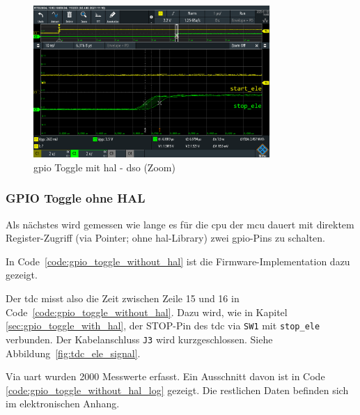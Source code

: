 \begin{figure}[H]
    \centering
    \includegraphics[width=0.8\textwidth]{graphics/gpio_toggle_with_hal_dso_zoom.png}
    \caption{\acrshort{gpio} Toggle mit \acrshort{hal} - \acrshort{dso} (Zoom)}\label{fig:gpio_toggle_with_hal_dso_zoom}
\end{figure}

\subsubsection{GPIO Toggle ohne HAL}\label{sec:gpio_toggle_without_hal}

Als nächstes wird gemessen wie lange es für die \acrshort{cpu} der \acrshort{mcu} dauert mit direktem Register-Zugriff
(via Pointer; ohne \acrshort{hal}-Library) zwei \acrshort{gpio}-Pins zu schalten.

In Code~\ref{code:gpio_toggle_without_hal} ist die Firmware-Implementation dazu gezeigt.



Der \acrshort{tdc} misst also die Zeit zwischen Zeile 15 und 16 in Code~\ref{code:gpio_toggle_without_hal}. Dazu wird,
wie in Kapitel \ref{sec:gpio_toggle_with_hal}, der STOP-Pin des \acrshort{tdc} via \lstinline|SW1| mit
\lstinline|stop_ele| verbunden. Der Kabelanschluss \lstinline|J3| wird kurzgeschlossen. Siehe
Abbildung~\ref{fig:tdc_ele_signal}.

Via \acrshort{uart} wurden 2000 Messwerte erfasst. Ein Ausschnitt davon ist in Code
\ref{code:gpio_toggle_without_hal_log} gezeigt. Die restlichen Daten befinden sich im elektronischen Anhang.



